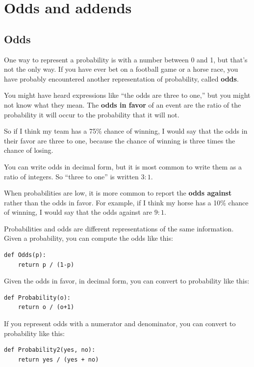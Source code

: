 \documentclass[12pt]{book}
\begin{document}
\chapter{Odds and addends}

\section{Odds}

One way to represent a probability is with a number between
0 and 1, but that's not the only way.  If you have ever bet
on a football game or a horse race, you have probably encountered
another representation of probability, called {\bf odds}.

You might have heard expressions like ``the odds are
three to one,'' but you might not know what they mean.  
The {\bf odds in favor} of an event are the ratio of the probability
it will occur to the probability that it will not.

So if I think my team has a 75\% chance of winning, I would
say that the odds in their favor are three to one, because
the chance of winning is three times the chance of losing.

You can write odds in decimal form, but it is most common to
write them as a ratio of integers.  So ``three to one'' is
written $3:1$.

When probabilities are low, it is more common to report the
{\bf odds against} rather than the odds in favor.  For
example, if I think my horse has a 10\% chance of winning,
I would say that the odds against are $9:1$.

Probabilities and odds are different representations of the
same information.  Given a probability, you can compute the
odds like this:

\begin{verbatim}
def Odds(p):
    return p / (1-p)
\end{verbatim}

Given the odds in favor, in decimal form, you can convert to
probability like this:

\begin{verbatim}
def Probability(o):
    return o / (o+1)
\end{verbatim}

If you represent odds with a numerator and denominator, you
can convert to probability like this:

\begin{verbatim}
def Probability2(yes, no):
    return yes / (yes + no)
\end{verbatim}
\end{document}

